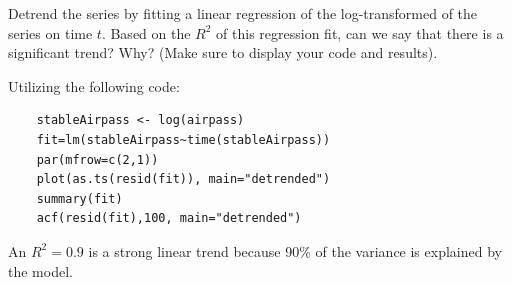 Detrend the series by fitting a linear regression of the log-transformed of the series on time $t$. Based on the $R^2$ of this regression fit, can we say that there is a significant trend? Why? (Make sure to display your code and results).

\nl Utilizing the following code: 

\begin{verbatim}
    stableAirpass <- log(airpass)
    fit=lm(stableAirpass~time(stableAirpass))
    par(mfrow=c(2,1))
    plot(as.ts(resid(fit)), main="detrended")
    summary(fit)
    acf(resid(fit),100, main="detrended")
\end{verbatim}

An $R^2 = 0.9$ is a strong linear trend because 90\% of the variance is explained by the model.

\nnl{}
